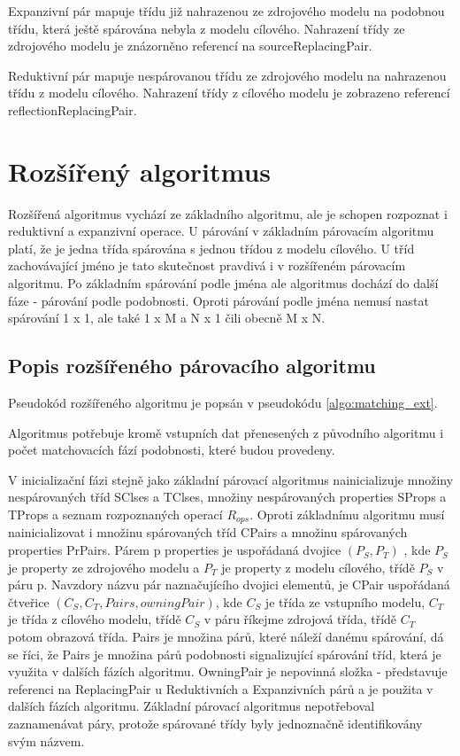 \documentclass[11pt,twoside,a4paper]{book}
\begin{document}
 Expanzivní pár mapuje třídu již nahrazenou ze zdrojového modelu na podobnou
 třídu, která ještě spárována nebyla z modelu cílového. Nahrazení třídy ze
 zdrojového modelu je znázorněno referencí na sourceReplacingPair. 
 
 Reduktivní pár mapuje nespárovanou třídu ze zdrojového modelu na nahrazenou
 třídu z modelu cílového. Nahrazení třídy z cílového modelu je zobrazeno
 referencí reflectionReplacingPair.
 
 \section{Rozšířený algoritmus}
 Rozšířená algoritmus vychází ze základního algoritmu, ale je schopen rozpoznat
 i reduktivní a expanzivní operace. U párování v základním párovacím algoritmu
 platí, že je jedna třída spárována s jednou třídou z modelu cílového. U tříd
 zachovávající jméno je tato skutečnost pravdivá i v rozšířeném párovacím
 algoritmu. Po základním spárování podle jména ale algoritmus dochází do další
 fáze  - párování podle podobnosti. Oproti párování podle jména
 nemusí nastat spárování 1 x 1, ale také 1 x M a N x 1 čili obecně M x N. 
 
\subsection{Popis rozšířeného párovacího algoritmu}
Pseudokód rozšířeného algoritmu je popsán v pseudokódu
\ref{algo:matching_ext}.

Algoritmus potřebuje kromě vstupních dat přenesených z původního algoritmu i
počet matchovacích fází podobnosti, které budou provedeny.

V inicializační fázi stejně jako základní párovací algoritmus nainicializuje
množiny nespárovaných tříd SClses a TClses, množiny nespárovaných properties
SProps a TProps a seznam rozpoznaných operací $R_{ops}$.
Oproti základnímu algoritmu musí nainicializovat i množinu spárovaných tříd
CPairs a množinu spárovaných properties PrPairs. Párem p properties je
uspořádaná dvojice $(P_S, P_T)$ , kde $P_S$ je property ze zdrojového modelu
a $P_T$ je property z modelu cílového, třídě $P_S$ v páru p. Navzdory názvu pár
naznačujícího dvojici elementů, je CPair uspořádaná čtveřice $(C_S, C_T, Pairs,
owningPair)$, kde $C_S$ je třída ze vstupního modelu, $C_T$ je třída z cílového
modelu, třídě $C_S$ v páru říkejme zdrojová třída, třídě $C_T$ potom obrazová třída.
Pairs je množina párů, které náleží danému spárování, dá se říci, že Pairs je množina
párů podobnosti signalizující spárování tříd, která je využita v dalších fázích
algoritmu. OwningPair je nepovinná složka - představuje referenci na
ReplacingPair u Reduktivních a Expanzivních párů a je použita v dalších fázích
algoritmu. Základní párovací algoritmus nepotřeboval zaznamenávat páry, protože
spárované třídy byly jednoznačně identifikovány svým názvem.
\end{document}

